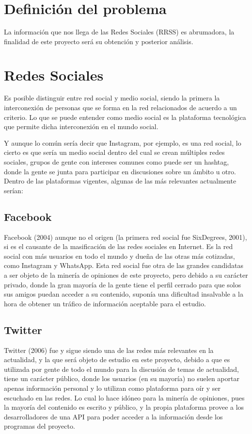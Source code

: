 	\section{Definición del problema}
	
	La información que nos llega de las Redes Sociales (RRSS) es abrumadora, la finalidad de este proyecto será su obtención y posterior análisis.
	
	\section{Redes Sociales}
	
	Es posible distinguir entre red social y medio social, siendo la primera la interconexión de personas que se forma en la red relacionados de acuerdo a un criterio. Lo que se puede entender como medio social es la plataforma tecnológica que permite dicha interconexión en el mundo social.
	
	 Y aunque lo común sería decir que Instagram, por ejemplo, es una red social, lo cierto es que sería un medio social dentro del cual se crean múltiples redes sociales, grupos de gente con intereses comunes como puede ser un hashtag, donde la gente se junta para participar en discusiones sobre un ámbito u otro. Dentro de las plataformas vigentes, algunas de las más relevantes actualmente serían: 
	
	\subsection{Facebook}
	
	Facebook (2004) aunque no el origen (la primera red social fue SixDegrees, 2001), si es el causante de la masificación de las redes sociales en Internet. Es la red social con más usuarios en todo el mundo y dueña de las otras más cotizadas, como Instagram y WhatsApp. Esta red social fue otra de las grandes candidatas a ser objeto de la minería de opiniones de este proyecto, pero debido a su carácter privado, donde la gran mayoría de la gente tiene el perfil cerrado para que solos sus amigos puedan acceder a su contenido, suponía una dificultad insalvable a la hora de obtener un tráfico de información aceptable para el estudio. 
	
	\subsection{Twitter}
	
	Twitter (2006) fue y sigue siendo una de las redes más relevantes en la actualidad, y la que será objeto de estudio en este proyecto, debido a que es utilizada por gente de todo el mundo para la discusión de temas de actualidad, tiene un carácter público, donde los usuarios (en su mayoría) no suelen aportar apenas información personal y lo utilizan como plataforma para oír y ser escuchado en las redes. Lo cual lo hace idóneo para la minería de opiniones, pues la mayoría del contenido es escrito y público, y la propia plataforma provee a los desarrolladores de una API para poder acceder a la información desde los programas del proyecto.
	
